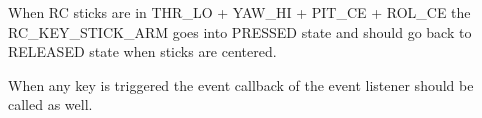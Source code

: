 
\begin{DoxyItemize}
\item When R\+C sticks are in T\+H\+R\+\_\+\+L\+O + Y\+A\+W\+\_\+\+H\+I + P\+I\+T\+\_\+\+C\+E + R\+O\+L\+\_\+\+C\+E the R\+C\+\_\+\+K\+E\+Y\+\_\+\+S\+T\+I\+C\+K\+\_\+\+A\+R\+M goes into P\+R\+E\+S\+S\+E\+D state and should go back to R\+E\+L\+E\+A\+S\+E\+D state when sticks are centered.
\item When any key is triggered the event callback of the event listener should be called as well. 
\end{DoxyItemize}